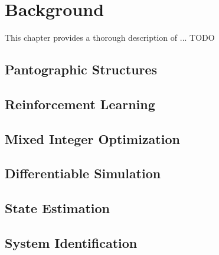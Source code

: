 \chapter{Background}
\label{sec:background}
This chapter provides a thorough description of ... TODO


\section{Pantographic Structures}

\section{Reinforcement Learning}

\section{Mixed Integer Optimization}

\section{Differentiable Simulation}

\section{State Estimation}

\section{System Identification}


